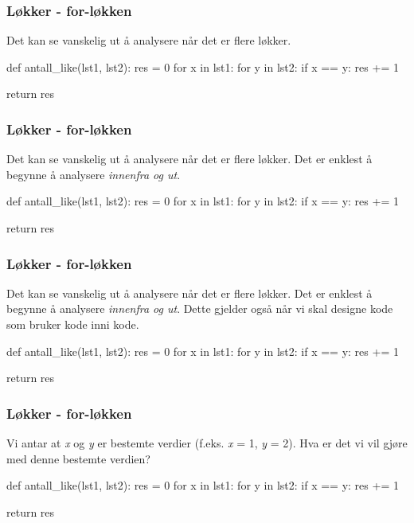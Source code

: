 \begin{frame}[fragile]
    \frametitle{Løkker - for-løkken}

    Det kan se vanskelig ut å analysere når det er flere løkker. 

\begin{python}
def antall_like(lst1, lst2):
    res = 0
    for x in lst1: 
        for y in lst2:
            if x == y: 
                res += 1
    
    return res
\end{python}

\end{frame}

\begin{frame}[fragile]
    \frametitle{Løkker - for-løkken}

    Det kan se vanskelig ut å analysere når det er flere løkker. Det er enklest å begynne å analysere \textit{innenfra og ut}.

\begin{python}
def antall_like(lst1, lst2):
    res = 0
    for x in lst1: 
        for y in lst2:
            if x == y: 
                res += 1
    
    return res
\end{python}

\end{frame}

\begin{frame}[fragile]
    \frametitle{Løkker - for-løkken}

    Det kan se vanskelig ut å analysere når det er flere løkker. Det er enklest å begynne å analysere \textit{innenfra og ut}. Dette gjelder også når vi skal designe kode som bruker kode inni kode. 

\begin{python}
def antall_like(lst1, lst2):
    res = 0
    for x in lst1: 
        for y in lst2:
            if x == y: 
                res += 1
    
    return res
\end{python}

\end{frame}

\begin{frame}[fragile]
    \frametitle{Løkker - for-løkken}

    Vi antar at \textit{x} og \textit{y} er bestemte verdier (f.eks. \textit{x} = 1, \textit{y} = 2). Hva er det vi vil gjøre med denne bestemte verdien? 

\begin{python}
def antall_like(lst1, lst2):
    res = 0
    for x in lst1: 
        for y in lst2:
            if x == y: 
                res += 1
    
    return res
\end{python}

\end{frame}

